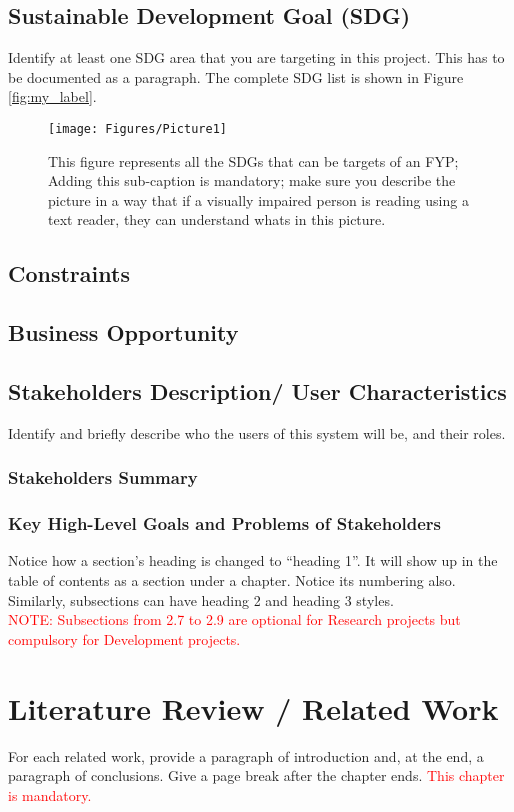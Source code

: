 \documentclass{FastFyp}
\begin{document}
\section{Sustainable Development Goal (SDG)}
Identify at least one SDG area that you are targeting in this project. This has to be documented as a paragraph. The complete SDG list is shown in Figure \ref{fig:my_label}.
\begin{figure} [!h]
    \centering
\texttt{[image: Figures/Picture1]}
    \caption{This figure represents all the SDGs that can be targets of an FYP; Adding this sub-caption is mandatory; make sure you describe the picture in a way that if a visually impaired person is reading using a text reader, they can understand whats in this picture.}
    \label{fig:1}
\end{figure}
\section{Constraints}
\section{Business Opportunity}
\section{Stakeholders Description/ User Characteristics}
Identify and briefly describe who the users of this system will be, and their roles.
\subsection{Stakeholders Summary}
\subsection{Key High-Level Goals and Problems of Stakeholders}
Notice how a section’s heading is changed to “heading 1”.  It will show up in the table of contents as a section under a chapter.  Notice its numbering also. Similarly, subsections can have heading 2 and heading 3 styles.\\
\textcolor{red}{NOTE: Subsections from 2.7 to 2.9 are optional for Research projects but compulsory for Development projects.}

\chapter{Literature Review / Related Work}
For each related work, provide a paragraph of introduction and, at the end, a paragraph of conclusions. Give a page break after the chapter ends. \textcolor{red}{This chapter is mandatory.}
\end{document}
